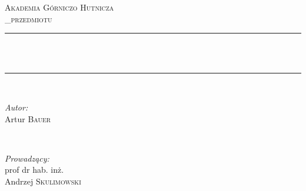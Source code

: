 \begin{titlepage}
\makeatletter

\newcommand{\HRule}{\rule{\linewidth}{0.5mm}} %

\center %
 

\textsc{\LARGE Akademia Górniczo Hutnicza}\\[1.5cm] %
\textsc{\nazwa_przedmiotu}\\[0.5cm] %


\HRule \\[0.4cm]
{ \huge \bfseries \@title} \\[1.4cm] %
\HRule \\[1.5cm]
 

\begin{minipage}{0.4\textwidth}
\begin{flushleft} \large
\emph{Autor:}\\
Artur \textsc{Bauer} %
\end{flushleft}
\end{minipage}
~
\begin{minipage}{0.4\textwidth}
\begin{flushright} \large
\emph{Prowadzący:} \\
prof dr hab. inż. \\Andrzej \textsc{Skulimowski} %
\end{flushright}
\end{minipage}\\[2cm]



\end{titlepage}
